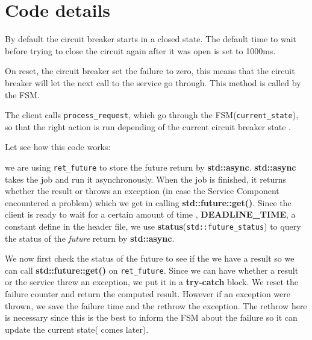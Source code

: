 \documentclass[a4paper,12pt]{article}
\begin{document}
    

\begin{center}
  
\end{center}


\section{Code details}
 
 By default the circuit breaker starts in a closed state. The default time to wait before trying to close the circuit again after it was open is set to 1000ms.
 
 
 On reset, the circuit breaker set the failure to zero, this means that the circuit breaker will let the next call to the service go through. This method is called by the FSM.



 The client calls \verb+process_request+, which go through the FSM(\verb+current_state+), so that the right action is run depending of the current circuit breaker state .
 


Let see how this code works:



we are using \verb+ret_future+ to store the future return by \textbf{std::async}. \textbf{std::async} takes the job and run it 
asynchronously. When the job is finished, it returns whether the result or throws an exception (in case the Service Component encountered a problem) which we get in calling \textbf{std::future::get()}. 
Since the client is ready to wait for a certain amount of time , \textbf{DEADLINE\_TIME}, a constant define in the header file, we use \textbf{status}(\verb+std::future_status+) to query the status of the \textit{future} return by 
\textbf{std::async}. 


We now first check the status of the future to see if the we have a result so we can call \textbf{std::future::get()} on 
\verb+ret_future+. Since we can have whether a result or the service threw an exception, we put it in a \textbf{try-catch} block. We reset the failure counter and return the computed  result.
However if an exception were thrown, we save the failure time and the rethrow the exception. The rethrow here is necessary since this is the best to inform the FSM about the failure so it can update the current state( comes later).
\end{document}
